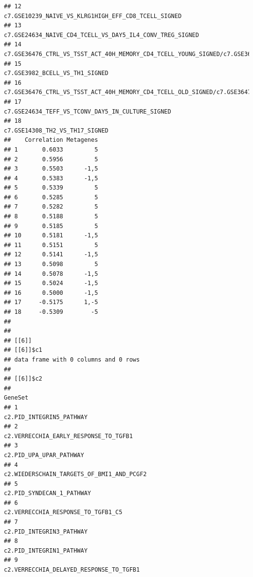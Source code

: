 \documentclass{article}\usepackage[]{graphicx}\usepackage[]{color}
\makeatletter
\newenvironment{kframe}{%
 \def\at@end@of@kframe{}%
 \ifinner\ifhmode%
  \def\at@end@of@kframe{\end{minipage}}%
  \begin{minipage}{\columnwidth}%
 \fi\fi%
 \def\FrameCommand##1{\hskip\@totalleftmargin \hskip-\fboxsep
 \colorbox{shadecolor}{##1}\hskip-\fboxsep
     \hskip-\linewidth \hskip-\@totalleftmargin \hskip\columnwidth}%
 \MakeFramed {\advance\hsize-\width
   \@totalleftmargin\z@ \linewidth\hsize
   \@setminipage}}%
 {\par\unskip\endMakeFramed%
 \at@end@of@kframe}
\newenvironment{knitrout}{}{} %
\makeatother
\begin{document}
\begin{knitrout}
\begin{kframe}
\begin{verbatim}
## 12                                                                           c7.GSE10239_NAIVE_VS_KLRG1HIGH_EFF_CD8_TCELL_SIGNED
## 13                                                                      c7.GSE24634_NAIVE_CD4_TCELL_VS_DAY5_IL4_CONV_TREG_SIGNED
## 14 c7.GSE36476_CTRL_VS_TSST_ACT_40H_MEMORY_CD4_TCELL_YOUNG_SIGNED/c7.GSE36476_CTRL_VS_TSST_ACT_72H_MEMORY_CD4_TCELL_YOUNG_SIGNED
## 15                                                                                                c7.GSE3982_BCELL_VS_TH1_SIGNED
## 16     c7.GSE36476_CTRL_VS_TSST_ACT_40H_MEMORY_CD4_TCELL_OLD_SIGNED/c7.GSE36476_CTRL_VS_TSST_ACT_72H_MEMORY_CD4_TCELL_OLD_SIGNED
## 17                                                                              c7.GSE24634_TEFF_VS_TCONV_DAY5_IN_CULTURE_SIGNED
## 18                                                                                                c7.GSE14308_TH2_VS_TH17_SIGNED
##    Correlation Metagenes
## 1       0.6033         5
## 2       0.5956         5
## 3       0.5503      -1,5
## 4       0.5383      -1,5
## 5       0.5339         5
## 6       0.5285         5
## 7       0.5282         5
## 8       0.5188         5
## 9       0.5185         5
## 10      0.5181      -1,5
## 11      0.5151         5
## 12      0.5141      -1,5
## 13      0.5098         5
## 14      0.5078      -1,5
## 15      0.5024      -1,5
## 16      0.5000      -1,5
## 17     -0.5175      1,-5
## 18     -0.5309        -5
## 
## 
## [[6]]
## [[6]]$c1
## data frame with 0 columns and 0 rows
## 
## [[6]]$c2
##                                                                                                   GeneSet
## 1                                                                                c2.PID_INTEGRIN5_PATHWAY
## 2                                                                   c2.VERRECCHIA_EARLY_RESPONSE_TO_TGFB1
## 3                                                                                 c2.PID_UPA_UPAR_PATHWAY
## 4                                                               c2.WIEDERSCHAIN_TARGETS_OF_BMI1_AND_PCGF2
## 5                                                                               c2.PID_SYNDECAN_1_PATHWAY
## 6                                                                      c2.VERRECCHIA_RESPONSE_TO_TGFB1_C5
## 7                                                                                c2.PID_INTEGRIN3_PATHWAY
## 8                                                                                c2.PID_INTEGRIN1_PATHWAY
## 9                                                                 c2.VERRECCHIA_DELAYED_RESPONSE_TO_TGFB1

\end{verbatim}
\end{kframe}
\end{knitrout}
\end{document}
